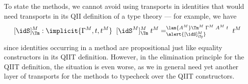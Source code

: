 \documentclass[a4paper,UKenglish,numberwithinsect,cleveref,thm-restate]{lipics-v2021}
\begin{document}
\begin{remark}
  To state the methods, we cannot avoid using transports in identities that would need transports in its QII definition of a type theory --- for example, we have
  \[
    [\idS]_{\Tm}^M : \implicit{\Gamma^M, t, t^M} \;\;[\idS^M]^M_{\Tm}\;t^M  =^{\lam{A^M}\Tm^M\;\Gamma^M\;A^M\;t}_{\alert{[\idS]^M_{\Ty}}} \; t^M
  \]
  since identities occurring in a method %
  are propositional just like equality constructors in its QIIT definition.
  However, in the elimination principle for the QIIT definition, the situation is even worse, as we in general need yet another layer of transports for the methods to typecheck over the QIIT constructors.

\end{remark}
\end{document}

